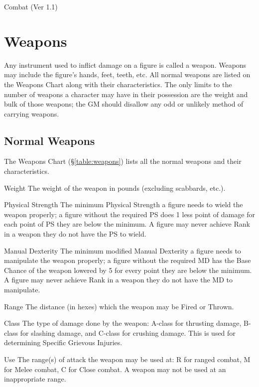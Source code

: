 \begin{Chapter}{Combat (Ver 1.1)}
\section{Weapons}
\label{combat:weapons}

Any instrument used to inflict damage on a figure is called a weapon.
Weapons may include the figure’s hands, feet, teeth, etc. All normal
weapons are listed on the Weapons Chart along with their
characteristics.  The only limits to the number of weapons a character
may have in their possession are the weight and bulk of those weapons;
the GM should disallow any odd or unlikely method of carrying weapons.

\subsection{Normal Weapons}

The Weapons Chart (\S\ref{table:weapons}) lists all the normal weapons
and their characteristics.

Weight The weight of the weapon in pounds (excluding scabbards,
etc.).

\begin{Description}

\item[Physical Strength] The minimum Physical Strength a figure needs
  to wield the weapon properly; a figure without the required PS does
  1 less point of damage for each point of PS they are below the
  minimum.  A figure may never achieve Rank in a weapon they do not
  have the PS to wield.

\item[Manual Dexterity] The minimum modified Manual Dexterity a figure
  needs to manipulate the weapon properly; a figure without the
  required MD has the Base Chance of the weapon lowered by 5 for every
  point they are below the minimum.  A figure may never achieve Rank
  in a weapon they do not have the MD to manipulate.

\item[Range] The distance (in hexes) which the weapon may be Fired or
  Thrown.

\item[Class] The type of damage done by the weapon: A-class for
  thrusting damage, B-class for slashing damage, and C-class for
  crushing damage.  This is used for determining Specific Grievous
  Injuries.

\item[Use] The range(s) of attack the weapon may be used at: R for
  ranged combat, M for Melee combat, C for Close combat. A weapon may
  not be used at an inappropriate range.


\end{Description}
\end{Chapter}
